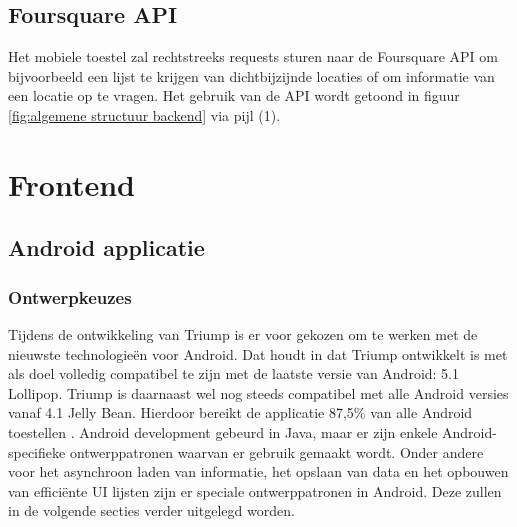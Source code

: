 \subsection{Foursquare API}
Het mobiele toestel zal rechtstreeks requests sturen naar de Foursquare API om bijvoorbeeld een lijst te krijgen van dichtbijzijnde locaties of om informatie van een locatie op te vragen. Het gebruik van de API wordt getoond in figuur \ref{fig:algemene structuur backend} via pijl (1).


\section{Frontend}
\subsection{Android applicatie}

\subsubsection{Ontwerpkeuzes}
Tijdens de ontwikkeling van Triump is er voor gekozen om te werken met de nieuwste technologieën voor Android. Dat houdt in dat Triump ontwikkelt is met als doel volledig compatibel te zijn met de laatste versie van Android: 5.1 Lollipop. Triump is daarnaast wel nog steeds compatibel met alle Android versies vanaf 4.1 Jelly Bean. Hierdoor bereikt de applicatie 87,5\% van alle Android toestellen \cite{market_share}. 
Android development gebeurd in Java, maar er zijn enkele Android-specifieke ontwerppatronen waarvan er gebruik gemaakt wordt. Onder andere voor het asynchroon laden van informatie, het opslaan van data en het opbouwen van efficiënte UI lijsten zijn er speciale ontwerppatronen in Android. Deze zullen in de volgende secties verder uitgelegd worden.


